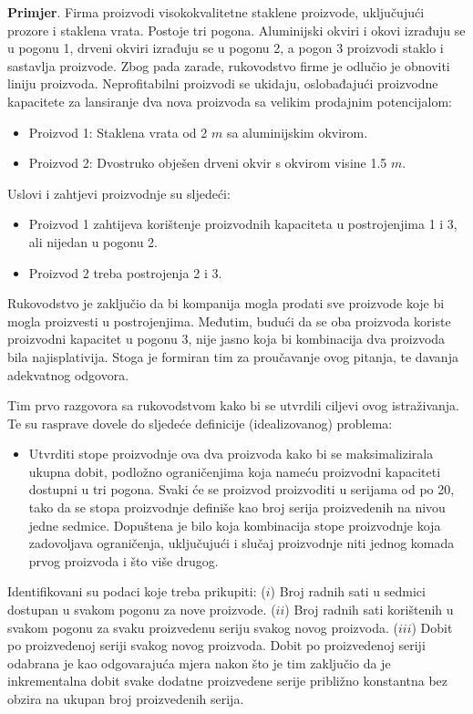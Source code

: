 \documentclass[a4paper, utf8, 11pt, colorlinks]{book}
\begin{document}
\textbf{Primjer}. %
Firma proizvodi visokokvalitetne staklene proizvode, uključujući prozore i staklena vrata. Postoje tri pogona. Aluminijski okviri i okovi izrađuju se u pogonu 1, drveni okviri izrađuju se u pogonu 2, a pogon 3 proizvodi staklo i sastavlja proizvode.
Zbog pada zarade, rukovodstvo firme je odlučio je obnoviti liniju proizvoda. Neprofitabilni proizvodi se ukidaju, oslobađajući proizvodne kapacitete za lansiranje dva nova proizvoda sa velikim prodajnim potencijalom:
\begin{itemize}
    \item Proizvod 1: Staklena vrata od 2 $m$ sa aluminijskim okvirom.
    \item Proizvod 2: Dvostruko obješen drveni okvir s okvirom visine 1.5 $m$.
\end{itemize}
Uslovi i zahtjevi proizvodnje su sljedeći:
\begin{itemize}
    \item Proizvod 1 zahtijeva   korištenje proizvodnih kapaciteta u postrojenjima 1 i 3, ali nijedan u pogonu 2. 
    \item Proizvod 2 treba   postrojenja 2 i 3. 
\end{itemize}
    Rukovodstvo je zaključio da bi kompanija mogla prodati sve proizvode koje bi mogla proizvesti u postrojenjima. Međutim, budući da se oba proizvoda koriste proizvodni kapacitet u pogonu 3, nije jasno koja bi kombinacija dva proizvoda bila najisplativija. Stoga je formiran tim za proučavanje ovog pitanja, te davanja adekvatnog odgovora.

Tim prvo razgovora sa rukovodstvom kako bi se utvrdili ciljevi ovog istraživanja. Te su rasprave dovele do sljedeće definicije (idealizovanog) problema:
\begin{itemize}
    \item Utvrditi  stope proizvodnje  ova dva proizvoda kako bi se maksimalizirala ukupna dobit, podložno ograničenjima koja nameću   proizvodni kapaciteti dostupni u tri pogona. Svaki će se proizvod proizvoditi u serijama od po 20, tako da se stopa proizvodnje definiše kao broj serija proizvedenih na nivou jedne sedmice. Dopuštena je bilo koja kombinacija stope proizvodnje koja zadovoljava   ograničenja, uključujući i slučaj proizvodnje niti jednog komada prvog proizvoda i što  više   drugog. 
\end{itemize}

Identifikovani su podaci koje treba prikupiti: 
($i$) Broj radnih sati u sedmici dostupan u svakom pogonu za nove proizvode.  
($ii$) Broj radnih sati korištenih u svakom pogonu za svaku proizvedenu seriju svakog novog proizvoda.
($iii$) Dobit po proizvedenoj seriji svakog novog proizvoda. Dobit po proizvedenoj seriji odabrana je kao odgovarajuća mjera nakon što je tim zaključio da je inkrementalna dobit svake dodatne proizvedene serije   približno konstantna bez obzira na ukupan broj proizvedenih serija.
\end{document}
